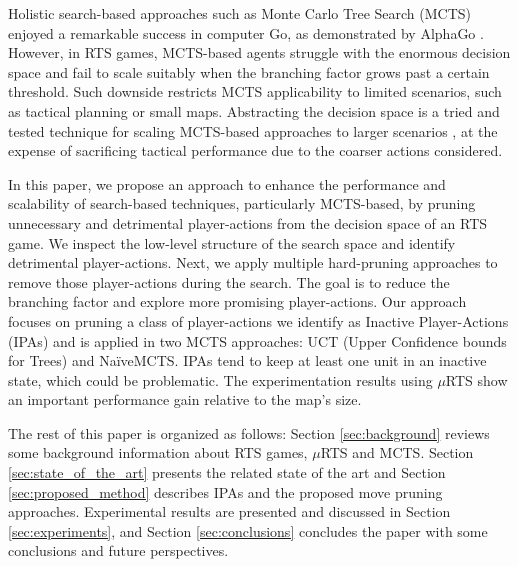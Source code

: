 \documentclass[conference]{IEEEtran}
\newcommand{\mRTS}{$\mu$RTS}
\begin{document}
Holistic search-based approaches such as Monte Carlo Tree Search (MCTS) \cite{browne_survey_2012} enjoyed a remarkable success in computer Go, as demonstrated by AlphaGo \cite{silver_mastering_2016}.
 However, in RTS games, MCTS-based agents struggle with the enormous decision space and fail to scale suitably when the branching factor grows past a certain threshold. Such downside restricts MCTS applicability to limited scenarios, such as tactical planning or small maps. Abstracting the decision space is a tried and tested technique for scaling MCTS-based approaches to larger scenarios \cite{ontanon_survey_2013}, 
at the expense of sacrificing tactical performance due to the coarser actions considered.

In this paper, we propose an approach to enhance the performance and scalability of search-based techniques, particularly MCTS-based, by pruning unnecessary and detrimental player-actions from the decision space of an RTS game. 
We inspect the low-level structure of the search space and identify detrimental player-actions. Next, we apply multiple hard-pruning approaches to remove those player-actions during the search. The goal is to reduce the branching factor and explore more promising player-actions. Our approach focuses on pruning a class of player-actions we identify as Inactive Player-Actions (IPAs) 
and is applied in two MCTS approaches: UCT (Upper Confidence bounds for Trees)
 and NaïveMCTS. IPAs tend to keep at least one unit in an inactive state, which could be  problematic. The experimentation results using \mRTS{} show an important performance gain relative to the map's size.

The rest of this paper is organized as follows: Section \ref{sec:background} reviews some background information about RTS games, \mRTS{} and MCTS. Section \ref{sec:state_of_the_art} presents the related state of the art and Section \ref{sec:proposed_method} describes IPAs and the proposed move pruning approaches. Experimental results are presented and discussed in Section \ref{sec:experiments}, and Section \ref{sec:conclusions} concludes the paper with some conclusions and future perspectives.
\end{document}
